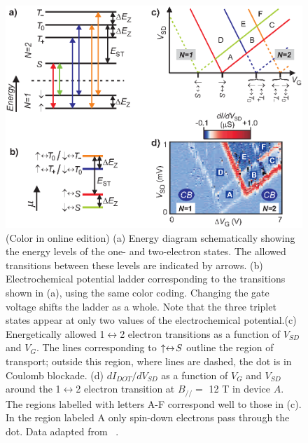 \documentclass[rmp,twocolumn,aps]{revtex4}
\begin{document}
\begin{figure}[htb]
\includegraphics[width=14cm]{hanson_fig08.eps}
\caption{(Color in online edition) (a) Energy diagram schematically showing the energy
levels of the one- and two-electron states. The allowed
transitions between these levels are indicated by arrows. (b)
Electrochemical potential ladder corresponding to the transitions
shown in (a), using the same color coding. Changing the gate
voltage shifts the ladder as a whole. Note that the three triplet
states appear at only two values of the electrochemical
potential.(c) Energetically allowed 1$\leftrightarrow$2 electron
transitions as a function of $V_{SD}$ and $V_{G}$. The lines
corresponding to $\uparrow\leftrightarrow\!S$ outline the region of
transport; outside this region, where lines are dashed, the dot is
in Coulomb blockade. (d) $dI_{DOT}/dV_{SD}$ as a function of $V_G$
and $V_{SD}$ around the 1$\leftrightarrow$2 electron transition at
$B_{/\!/}\!=\!$ 12 T in device $A$. The regions labelled with
letters A-F correspond well to those in (c). In the region labeled
A only spin-down electrons pass through the dot. Data adapted from
~\textcite{HansonPRB2004}.} \label{Fig:N1-2}
\end{figure}
\end{document}

